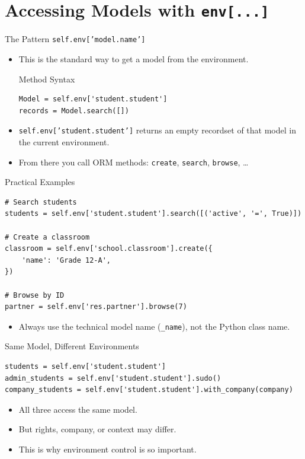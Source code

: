 \section{Accessing Models with \texttt{env[...]}}

\begin{frame}[fragile]{The Pattern \texttt{self.env['model.name']}}
	\begin{itemize}
		\item This is the standard way to get a model from the environment.
\begin{block}{Method Syntax}
\begin{lstlisting}
Model = self.env['student.student']
records = Model.search([])
\end{lstlisting}
\end{block}
		\item \texttt{self.env['student.student']} returns an empty recordset of that model in the current environment.
		\item From there you call ORM methods: \texttt{create}, \texttt{search}, \texttt{browse}, \ldots
	\end{itemize}
\end{frame}

\begin{frame}[fragile]{Practical Examples}
\begin{lstlisting}
# Search students
students = self.env['student.student'].search([('active', '=', True)])

# Create a classroom
classroom = self.env['school.classroom'].create({
	'name': 'Grade 12-A',
})

# Browse by ID
partner = self.env['res.partner'].browse(7)
\end{lstlisting}
	\begin{itemize}
		\item Always use the technical model name (\texttt{\_name}), not the Python class name.
	\end{itemize}
\end{frame}

\begin{frame}[fragile]{Same Model, Different Environments}
\begin{lstlisting}
students = self.env['student.student']
admin_students = self.env['student.student'].sudo()
company_students = self.env['student.student'].with_company(company)
\end{lstlisting}
	\begin{itemize}
		\item All three access the same model.
		\item But rights, company, or context may differ.
		\item This is why environment control is so important.
	\end{itemize}
\end{frame}
